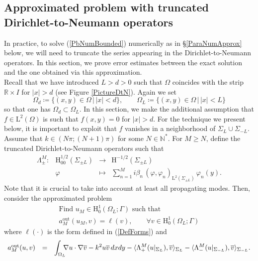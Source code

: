 \documentclass[11pt,a4paper]{report}
\newcommand{\dsp}{\displaystyle}
\newcommand{\Om}{\Omega}
\newcommand{\mrm}[1]{\mathrm{#1}}
\newcommand{\N}{\mathbb{N}}
\newcommand{\R}{\mathbb{R}}
\newcommand{\mL}{\mrm{L}}
\newcommand{\mH}{\mrm{H}}
\begin{document}
\subsection{Approximated problem with truncated Dirichlet-to-Neumann operators}\label{ParaTroncDTN}
In practice, to solve (\ref{PbNumBounded}) numerically as in \S\ref{ParaNumApprox} below, we will need to truncate the series appearing in the Dirichlet-to-Neumann operators. In this section, we prove error estimates between the exact solution and the one obtained via this approximation.\\
\newline
Recall that we have introduced $L>d>0$ such that $\Om$ coincides with the strip $\R\times I$ for $|x|>d$ (see Figure \ref{PictureDtN}). Again we set 
\[
\Om_d\coloneqq\{(x,y)\in\Om\,|\,|x|<d\},\qquad \Om_L\coloneqq\{(x,y)\in\Om\,|\,|x|<L\}
\]
so that one has $\Om_d\subset\Om_L$. In this section, we make the additional assumption that $f\in\mL^2(\Om)$ is such that $f(x,y)=0$ for $|x|>d$. For the technique we present below, it is important to exploit that $f$ vanishes in a neighborhood of $\Sigma_L\cup \Sigma_{-L}$. Assume that $k\in(N\pi;(N+1)\pi)$ for some $N\in\N^\ast$. For $M\ge N$, define the truncated Dirichlet-to-Neumann operators such that
\[
\begin{array}{lrcl}
\Lambda^M_\pm:& \mH^{1/2}_{00}(\Sigma_{\pm L}) & \to& \mH^{-1/2}(\Sigma_{\pm L}) \\[6pt]
 & \varphi & \mapsto  & \dsp\sum_{n=1}^{M} i\beta_n\, (\varphi,\varphi_n)_{\mL^2(\Sigma_{\pm L})}\,\varphi_n(y).
\end{array}
\]
Note that it is crucial to take into account at least all propagating modes. Then, consider the approximated problem
\begin{equation}\label{PbNumBoundedTrunc}
\begin{array}{|l}
\mbox{Find }u_M\in\mH^1_0(\Om_L;\Gamma) \mbox{ such that }\\[3pt]
a^{\mrm{out}}_M(u_M,v)=\ell(v),\qquad \forall v\in\mH^1_0(\Om_L;\Gamma)
\end{array}
\end{equation}
where $\ell(\cdot)$ is the form defined in (\ref{DefForms}) and 
\begin{equation}\label{DefFormsTrunc}
\begin{array}{rcl}
a^{\mrm{out}}_M(u,v)&=&\dsp\int_{\Om_L}\hspace{-0.2cm}\nabla u\cdot\nabla\overline{v}-k^2 u\overline{v}\,dxdy-\langle\Lambda^M_+(u|_{\Sigma_{L}}),\overline{v} \rangle_{\Sigma_L}-\langle\Lambda^M_-(u|_{\Sigma_{-L}}),\overline{v} \rangle_{\Sigma_{-L}}.
\end{array}
\end{equation}
\end{document}
